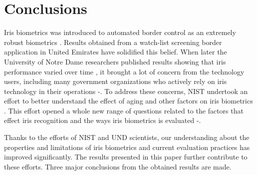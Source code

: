 \documentclass{cta-author}%
\newcommand{\cmt}[1]{}
\begin{document}
\section{Conclusions}



Iris biometrics was introduced to  automated border control as an extremely robust biometrics \cite{Daugman2002}.
Results obtained from a 
watch-list screening border application in United Emirates \cite{Daugman2006} have  solidified this belief.
When later
the University of Notre Dame researchers 
published results showing that iris performance varied over time \cmt{ among the test participants} \cite{Bowyer,Bowyer2,Bowyer3}, it brought a lot of concern from the technology users, including many government organizations 
who actively rely on iris technology in their operations \cite{aging}-\cite{aging3}. %
To address these concerns, NIST undertook an  effort
to better understand the effect of aging and other factors on  iris biometrics \cite{irexVI}. 
This effort opened a whole new range of 
questions related to the factors that effect iris recognition
and  the ways  iris biometrics is  evaluated \cite{Grother2015-iet}-\cite{Bowyer-BTAS2016}.



Thanks to the efforts of NIST and UND scientists, our understanding about the properties and limitations of iris biometrics and current evaluation practices has improved significantly. The results presented in this paper further contribute to these efforts. 
Three major conclusions from the obtained results  are made.
\end{document}
